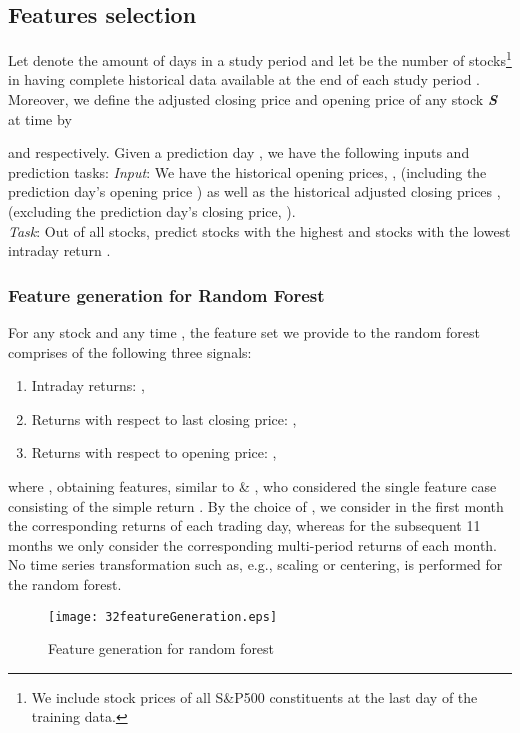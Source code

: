 \documentclass[review]{elsarticle}
\begin{document}
\subsection{Features selection}
\label{subsec:features}
Let  denote the amount of days in a study period
and let  be the number of stocks\footnote{We include stock prices of all S\&P500 constituents at the last day of the training data.}  in  having complete historical data available at the end of each study period . Moreover, we define the adjusted closing price and opening price of any stock \textbf{\textit{S}} at time   by 

and
 respectively.
\newline
Given a prediction day , we have the following inputs and prediction tasks: \newline
\textit{Input}: We have the historical opening prices,  , (including the prediction day's opening price ) 
as well as
the historical adjusted closing prices , (excluding the prediction day's closing price, ).
\\
\textit{Task}: Out of all  stocks, predict  stocks with the highest and  stocks with the lowest intraday return .


\newpage
\subsubsection{Feature  generation for Random Forest}\label{subsubsec:feature-RF}
For any stock  and any time , the 
feature set we provide  to the random forest comprises of the following three signals:
\begin{enumerate}\item Intraday returns: ,
    \item Returns with respect to last closing price: ,
    \item Returns with respect to opening price: ,
\end{enumerate}
where , obtaining  features, similar to \cite{takeuchi2013} \& \cite{krauss17}, who  considered the single feature case consisting of the simple return
. 
By the choice of ,
we consider in the first month the corresponding returns of each trading day, whereas for the subsequent 11 months we only consider the corresponding multi-period returns of each month.
No time series transformation such as, e.g., scaling or centering, is performed for the random forest.
\begin{figure}[h!]
	\centering
	
	\texttt{[image: 32featureGeneration.eps]} \hfill
	\caption{Feature  generation for random forest}
	\label{fig:figure3.2.1.featureGenRandomForest}
\end{figure}
\end{document}
